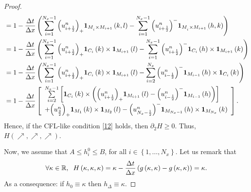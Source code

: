\documentclass[11pt,a4paper,center,notitlepage]{article}
\numberwithin{equation}{section}
\begin{document}
\begin{proof}
\begin{align*}
 &= 1 - \frac{{\Delta t}}{{\Delta x}}\left( {\sum\limits_{i = 1}^{{N_x} - 1} {{{\left( {u_{i + \frac{1}{2}}^n} \right)}_+ }{{\bf 1}_{{M_{_i}} \times {M_{i + 1}}}}\left( {k,l} \right)}  - \sum\limits_{i = 1}^{{N_x} - 1} {{{\left( {u_{i + \frac{1}{2}}^n} \right)}^ - }{{\bf 1}_{{M_{_i}} \times {M_{i + 1}}}}\left( {h,k} \right)} } \right)\\
 &= 1 - \frac{{\Delta t}}{{\Delta x}}\left( {\sum\limits_{i = 1}^{{N_x} - 1} {{{\left( {u_{i + \frac{1}{2}}^n} \right)}_+ }{{\bf 1}_{{C_i}}}\left( k \right) \times {{\bf 1}_{{M_{i + 1}}}}\left( l \right)}  - \sum\limits_{i = 1}^{{N_x} - 1} {{{\left( {u_{i + \frac{1}{2}}^n} \right)}^ - }{{\bf 1}_{{C_i}}}\left( h \right) \times {{\bf 1}_{{M_{i + 1}}}}\left( k \right)} } \right)\\
 &= 1 - \frac{{\Delta t}}{{\Delta x}}\left( {\sum\limits_{i = 1}^{{N_x} - 1} {{{\left( {u_{i + \frac{1}{2}}^n} \right)}_+ }{{\bf 1}_{{C_i}}}\left( k \right) \times {{\bf 1}_{{M_{i + 1}}}}\left( l \right)}  - \sum\limits_{i = 2}^{{N_x}} {{{\left( {u_{i - \frac{1}{2}}^n} \right)}^ - }{{\bf 1}_{{M_{i - 1}}}}\left( h \right) \times {{\bf 1}_{{C_i}}}\left( k \right)} } \right)\\
 &= 1 - \frac{{\Delta t}}{{\Delta x}}\left[ \begin{array}{l}
\sum\limits_{i = 2}^{{N_x} - 1} {\left[ {{{\bf 1}_{{C_i}}}\left( k \right) \times \left( {{{\left( {u_{i + \frac{1}{2}}^n} \right)}_+ }{{\bf 1}_{{M_{i + 1}}}}\left( l \right) - {{\left( {u_{i - \frac{1}{2}}^n} \right)}^ - }{{\bf 1}_{{M_{i - 1}}}}\left( h \right)} \right)} \right]} \\
 + {\left( {u_{\frac{3}{2}}^n} \right)_+ }{{\bf 1}_{{M_1}}}\left( k \right) \times {{\bf 1}_{{M_2}}}\left( l \right) - {\left( {u_{{N_x} - \frac{1}{2}}^n} \right)^ - }{{\bf 1}_{{M_{{N_x} - 1}}}}\left( h \right) \times {{\bf 1}_{{M_{{N_x}}}}}\left( k \right)
\end{array} \right].
\end{align*}
Hence, if the CFL-like condition \eqref{12} holds, then $\partial _2 H \ge 0$. Thus, $H\left( { \nearrow , \nearrow , \nearrow } \right)$. 

Now, we assume that $A \le h_i^0 \le B$, for all $i \in \left\{1,\ldots,N_x\right\}$. Let us remark that 
\begin{align*}
\forall \kappa  \in \mathbb{R}, \hspace{2mm} H\left( {\kappa ,\kappa ,\kappa } \right) = \kappa  - \frac{{\Delta t}}{{\Delta x}}\left( {g\left( {\kappa ,\kappa } \right) - g\left( {\kappa ,\kappa } \right)} \right) = \kappa .
\end{align*}
As a consequence: if $h_0 \equiv \kappa$ then $h_\Delta \equiv \kappa$. 


\end{proof}
\end{document}
